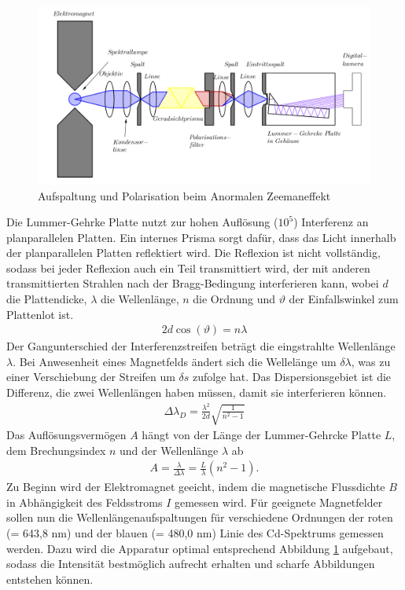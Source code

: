 \begin{figure}[H]
\includegraphics[width=1\textwidth]{../pics/aufbauZee.png}
\caption{Aufspaltung und Polarisation beim Anormalen Zeemaneffekt}
\label{pic_aufbauZee}
\end{figure}
Die Lummer-Gehrke Platte nutzt zur hohen Auflösung ($10^5$) Interferenz an planparallelen Platten. Ein internes Prisma sorgt dafür, dass das Licht
innerhalb der planparallelen Platten reflektiert wird. Die Reflexion ist nicht vollständig, sodass bei jeder Reflexion auch ein Teil transmittiert wird,
der mit anderen transmittierten Strahlen nach der Bragg-Bedingung interferieren kann, wobei $d$ die Plattendicke, $\lambda$ die Wellenlänge, $n$ die Ordnung und $\vartheta$
der Einfallswinkel zum Plattenlot ist.
\begin{align}
 2d\cos(\vartheta) = n\lambda
\end{align}
Der Gangunterschied der Interferenzstreifen beträgt die eingstrahlte Wellenlänge $\lambda$. Bei Anwesenheit eines Magnetfelds ändert sich die Wellelänge
um $\delta \lambda$, was zu einer Verschiebung der Streifen um $\delta s$ zufolge hat. Das Dispersionsgebiet ist die Differenz, die zwei Wellenlängen
haben müssen, damit sie interferieren können. 
\begin{align}
 \Delta \lambda_D = \frac{\lambda^2}{2d}\sqrt{\frac{1}{n^2-1}}
 \label{eq_lamdaD}
\end{align}
Das Auflösungsvermögen $A$ hängt von der Länge der Lummer-Gehrcke Platte $L$, dem Brechungsindex $n$ und der Wellenlänge $\lambda$ ab
\begin{align}
  A = \frac{\lambda}{\Delta \lambda}=\frac{L}{\lambda}(n^2-1).
\end{align}
Zu Beginn wird der Elektromagnet geeicht, indem die magnetische Flussdichte $B$ in Abhängigkeit des Feldsstroms $I$ gemessen wird. Für geeignete 
Magnetfelder sollen nun die Wellenlängenaufspaltungen für verschiedene Ordnungen der roten (= 643,8 nm) und der blauen (= 480,0 nm) Linie 
des Cd-Spektrums gemessen werden. Dazu wird die Apparatur optimal entsprechend Abbildung \ref{pic_aufbauZee} aufgebaut, sodass die Intensität
bestmöglich aufrecht erhalten und scharfe Abbildungen entstehen können.


